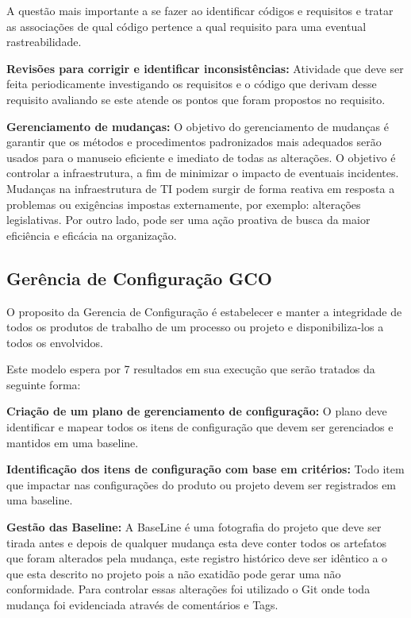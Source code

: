 \documentclass[	DIV=calc,%
							paper=a4,%
							fontsize=12pt,%
							onecolumn]{scrartcl}	 					%
\begin{document}
A questão mais importante a se fazer ao identificar códigos e requisitos e tratar as associações de qual código pertence a qual requisito para uma eventual rastreabilidade.

{\textbf{Revisões para corrigir e identificar inconsistências:}} Atividade que deve ser feita periodicamente investigando os requisitos e o código que derivam desse requisito avaliando se este atende os pontos que foram propostos no requisito.

{\textbf{Gerenciamento de mudanças:}} O objetivo do gerenciamento de mudanças é garantir que os métodos e procedimentos padronizados mais adequados serão usados para o manuseio eficiente e imediato de todas as alterações. O objetivo é controlar a infraestrutura, a fim de minimizar o impacto de eventuais incidentes. Mudanças na infraestrutura de TI podem surgir de forma reativa em resposta a problemas ou exigências impostas externamente, por exemplo: alterações legislativas. Por outro lado, pode ser uma ação proativa de busca da maior eficiência e eficácia na organização.


\subsection{Gerência de Configuração GCO}

O proposito da Gerencia de Configuração é estabelecer e manter a integridade de todos os produtos de trabalho de um processo ou projeto e disponibiliza-los a todos os envolvidos.


Este modelo espera por 7 resultados em sua execução que serão tratados da seguinte forma:


{\textbf{Criação de um plano de gerenciamento de configuração:}} O plano deve identificar e mapear todos os itens de configuração que devem ser gerenciados e mantidos em uma baseline.


{\textbf{Identificação dos itens de configuração com base em critérios:}} Todo item que impactar nas configurações do produto ou projeto devem ser registrados em uma baseline.


{\textbf{Gestão das Baseline:}} A BaseLine é uma fotografia do projeto que deve ser tirada antes e depois de qualquer mudança esta deve conter todos os artefatos que foram alterados pela mudança, este registro histórico deve ser idêntico a o que esta descrito no projeto pois a não exatidão pode gerar uma não conformidade. Para controlar essas alterações foi utilizado o Git onde toda mudança foi evidenciada através de comentários e Tags.
\end{document}
